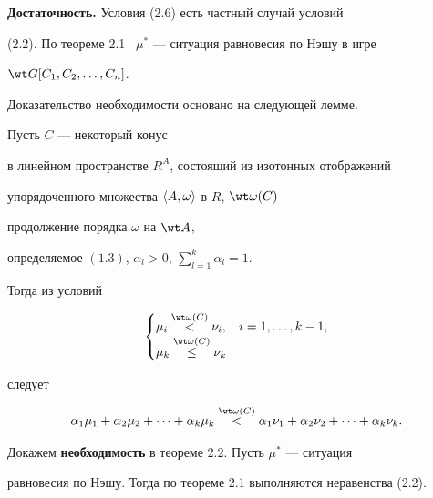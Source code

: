 \begin{pf} 


{\bf Достаточность.} Условия (2.6) есть частный случай условий 


(2.2). По теореме 2.1 \ $\mu^*$ --- ситуация равновесия по Нэшу в игре 


$\wt G[C_1,C_2,\dotsc,C_n]$. 


Доказательство необходимости основано на следующей лемме. 


 


\begin{lems} 


Пусть $C$ --- некоторый конус 


в линейном пространстве $R^A$, состоящий из изотонных отображений 


упорядоченного множества $\langle A,\omega\rangle$ в $R$, $\wt\omega(C)$ --- 


продолжение порядка $\omega$ на $\wt A$, 


определяемое $(1.3)$, $\alpha_l>0$, $\sum\limits^k_{l=1}\alpha_l=1$. 


Тогда из условий


$$


\begin{cases}


\mu_i\up{\wt\omega(C)}{<}\nu_i, & i=1,\dotsc,k-1,\\


\mu_k\up{\wt\omega(C)}{\le}\nu_k & \


\end{cases}


$$ 


следует


\begin{equation} 


\alpha_1\mu_1+\alpha_2\mu_2+\dotsb+


\alpha_k\mu_k \up{\wt\omega(C)}{<}


\alpha_1\nu_1+\alpha_2\nu_2+\dotsb+\alpha_k\nu_k.


\end{equation}


\end{lems} 


 


Докажем {\bf необходимость} в теореме 2.2. Пусть $\mu^*$ --- ситуация 


равновесия по Нэшу. Тогда по теореме 2.1 выполняются неравенства (2.2). 



\end{pf}
